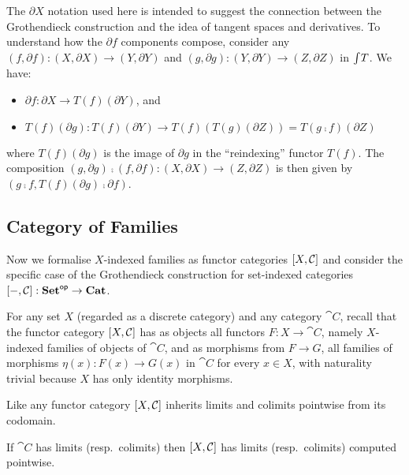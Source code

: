 \noindent The $\partial X$ notation used here is intended to suggest the connection between the Grothendieck
construction and the idea of tangent spaces and derivatives. To understand how the $\partial f$ components
compose, consider any $(f, \partial f): (X, \partial X) \to (Y, \partial Y)$ and $(g, \partial g): (Y,
\partial Y) \to (Z, \partial Z)$ in $\int_{}T$. We have:

\begin{itemize}
\item $\partial f: \partial X \to T(f)(\partial Y)$, and
\item $T(f)(\partial g): T(f)(\partial Y) \to T(f)(T(g)(\partial Z)) = T(g \comp f)(\partial Z)$
\end{itemize}

\noindent where $T(f)(\partial g)$ is the image of $\partial g$ in the ``reindexing'' functor $T(f)$. The
composition $(g, \partial g) \comp (f, \partial f): (X, \partial X) \to (Z, \partial Z)$ is then given by $(g
\comp f, T(f)(\partial g) \comp \partial f)$.

\subsection{Category of Families}
\label{sec:Fam}

Now we formalise $X$-indexed families as functor categories $[X,\mathcal{C}]$ and consider the specific case
of the Grothendieck construction for set-indexed categories $[-,\mathcal{C}]: \mathbf{Set}^{\mathsf{op}} \to \mathbf{Cat}$.

\begin{definition}
For any set $X$ (regarded as a discrete category) and any category $\cat{C}$, recall that the functor
category $[X,\mathcal{C}]$ has as objects all functors $F: X \to \cat{C}$, namely $X$-indexed families of
objects of $\cat{C}$, and as morphisms from $F \to G$, all families of morphisms $\eta(x): F(x) \to G(x)$ in
$\cat{C}$ for every $x \in X$, with naturality trivial because $X$ has only identity morphisms.
\end{definition}

Like any functor category $[X,\mathcal{C}]$ inherits limits and colimits pointwise from its codomain.

\begin{proposition}
If $\cat{C}$ has limits (resp.~colimits) then $[X,\mathcal{C}]$ has limits (resp.~colimits) computed
pointwise.
\end{proposition}

